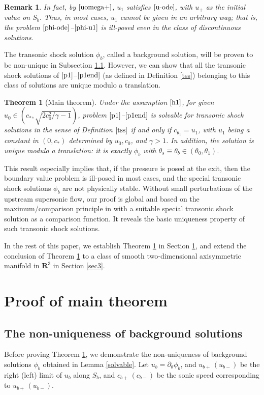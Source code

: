 \documentclass[reqno,12pt]{amsart}
\newtheorem{theorem}{Theorem}[section]
\newtheorem{remark}{Remark}[section]
\numberwithin{equation}{section}
\begin{document}
\begin{remark}
    In fact, by $\eqref{uomega+}$, $u_1$ satisfies $\eqref{u-ode}$, with $u_+$ as the initial value on $S_{b}$. Thus, in most cases, $u_1$ cannot be given in an arbitrary way; that is, the problem  $\eqref{phi-ode}$--$\eqref{phi-u1}$ is ill-posed even in the class of discontinuous solutions. 
\end{remark} 

The transonic shock solution $\phi_b$, called a background solution, will be proven to be non-unique in Subsection \ref{subsec2.1}. However, we can show that all the transonic shock solutions of $\eqref{p1}$--$\eqref{p1end}$ (as defined in Definition \ref{tss}) belonging to this class of solutions are unique modulo a translation.   
	
	\begin{theorem}[Main theorem]\label{unique}
		Under the assumption $\eqref{h1}$, for given $u_0\in(c_*, \sqrt{2c_0^2/\gamma-1})$, problem $\eqref{p1}$--$\eqref{p1end}$ is solvable for
		transonic shock solutions in the sense of Definition $\ref{tss}$ if and only if $c_{\theta_1} = u_1$, with $u_1$ being a constant in
		$(0,c_*)$ determined by $u_0, c_0$, and $ \gamma >1$. In addition, the solution is unique modulo a translation: it is exactly $\phi_b$ with $\theta_s\equiv\theta_b \in (\theta_0,\theta_1)$.
	\end{theorem}	

This result especially implies that, if the pressure is posed at the exit, then the boundary value problem is ill-posed in most cases, and the special transonic shock solutions $\phi_b$  are not physically stable. Without small perturbations of the upstream supersonic flow, our proof is global and based on the maximum/comparison principle in \cite{ellipticGT} with a suitable special transonic shock solution as a comparison function. It reveals the basic uniqueness property of such transonic shock solutions.

In the rest of this paper, we establish Theorem \ref{unique} in Section \ref{sec2}, and extend the conclusion of Theorem \ref{unique} to a class of smooth two-dimensional axisymmetric manifold in $\mathbf{R}^3$ in Section \ref{sec3}.    

 
\section{Proof of main theorem}\label{sec2}
\subsection{The non-uniqueness of background solutions}\label{subsec2.1}
Before proving Theorem \ref{unique}, we demonstrate the non-uniqueness of background solutions $\phi_b$ obtained in Lemma \ref{solvable}. Let $u_b=\partial_\theta \phi_b$, and $u_{b+}\, (u_{b-})$ be the right (left) limit of $u_b$ along $S_b$, and $c_{b+}\, (c_{b-})$ be the sonic speed corresponding to $u_{b+}\, (u_{b-})$.
\end{document}
